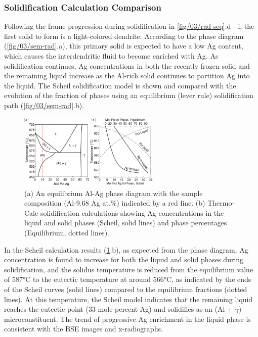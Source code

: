 \subsubsection{Solidification Calculation Comparison}
Following the frame progression during solidification in
\ref{fig/03/rad-seq}.d - i, the first solid to form is a light-colored
dendrite. According to the phase diagram (\ref{fig/03/sem-rad}.a),
this primary solid is expected to have a low Ag
content, which causes the interdendritic fluid to become enriched with Ag.
As solidification continues, Ag concentrations in both the recently frozen
solid and the remaining liquid increase as the Al-rich solid continues to
partition Ag into the liquid. The Scheil solidification model is shown and
compared with the evolution of the fraction of phases using an equilibrium
(lever rule) solidification path (\ref{fig/03/sem-rad}.b).

\begin{figure}[ht]
    \centering
    \includegraphics[width=0.6\textwidth]{figures/03/03-phase-scheil.png}
    \caption{
        \small{}
        (a) An equilibrium Al-Ag phase diagram with the sample composition
        (Al-9.68 Ag at.\%) indicated by a red line.
        (b) Thermo-Calc solidification calculations showing Ag concentrations
        in the liquid and solid phases (Scheil, solid lines) and phase
        percentages (Equilibrium, dotted lines).
    }
    \label{fig/03/phase-scheil}
\end{figure}

In the Scheil calculation results (\ref{fig/03/phase-scheil}.b),
as expected from the phase
diagram, Ag concentration is found to increase for both the liquid and
solid phases during solidification, and the solidus temperature is reduced
from the equilibrium value of 587°C to the eutectic temperature at around
566°C, as indicated by the ends of the Scheil curves (solid lines)
compared to the equilibrium fractions (dotted lines). At this temperature,
the Scheil model indicates that the remaining liquid reaches the eutectic
point (33 mole percent Ag) and solidifies as an (Al + $\gamma$) microconstituent.
The trend of progressive Ag enrichment in the liquid phase is consistent
with the BSE images and x-radiographs.

